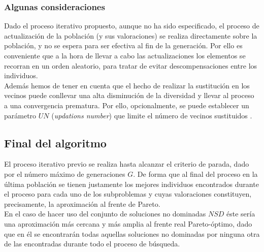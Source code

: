 \subsubsection{Algunas consideraciones}

Dado el proceso iterativo propuesto, aunque no ha sido especificado, el proceso de actualización de la población (y sus valoraciones) se realiza directamente sobre la población, y no se espera para ser efectiva al fin de la generación. Por ello es conveniente que a la hora de llevar a cabo las actualizaciones los elementos se recorran en un orden aleatorio, para tratar de evitar descompensaciones entre los individuos.\\

Además hemos de tener en cuenta que el hecho de realizar la sustitución en los vecinos puede conllevar una alta disminución de la diversidad y llevar al proceso a una convergencia prematura. Por ello, opcionalmente, se puede establecer un parámetro $UN$ (\textit{updations number}) que limite el número de vecinos sustituidos \cite{FranciscoV2010}.\\


\subsection{Final del algoritmo}

\justify

El proceso iterativo previo se realiza hasta alcanzar el criterio de parada, dado por el número máximo de generaciones $G$. De forma que al final del proceso en la última población se tienen justamente los mejores individuos encontrados durante el proceso para cada uno de los subproblemas y cuyas valoraciones constituyen, precisamente, la aproximación al frente de Pareto. \\

En el caso de hacer uso del conjunto de soluciones no dominadas $NSD$ éste sería una aproximación más cercana y más amplia al frente real Pareto-óptimo, dado que en él se encontrarán todas aquellas soluciones no dominadas por ninguna otra de las encontradas durante todo el proceso de búsqueda.\\ 



